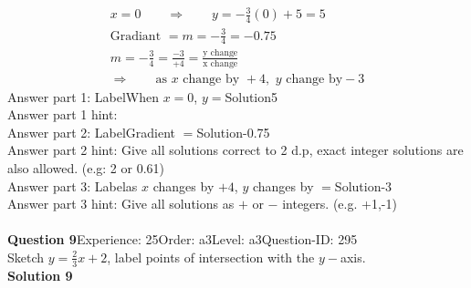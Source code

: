 \documentclass{article}
\begin{document}
\\[-35pt]\begin{align*}
&x=0\qquad\Rightarrow\qquad y=-\displaystyle\frac{3}{4}(0)+5=5&\\[2pt]
&\text{Gradiant}\,\,=m=-\displaystyle\frac{3}{4}=-0.75&\\[2pt]
&m=-\displaystyle\frac{3}{4}=\displaystyle\frac{-3}{+4}=\displaystyle\frac{\text{y change}}{\text{x change}}&\\[2pt]
& \Rightarrow\qquad \text{as}\,\, x \,\,\text{change by } +4,\,\, y\,\, \text{change by} -3 &
\end{align*}
Answer part 1: \hspace{10pt}Label\hspace{10pt}When $x=0$, $y=$\hspace{10pt}Solution\hspace{10pt}5\\
Answer part 1 hint: \hspace{15pt}\\
Answer part 2: \hspace{10pt}Label\hspace{10pt}Gradient $=$\hspace{10pt}Solution\hspace{10pt}-0.75\\
Answer part 2 hint: \hspace{15pt}Give all solutions correct to 2 d.p, exact integer solutions are also allowed. (e.g: 2 or 0.61)\\
Answer part 3: \hspace{10pt}Label\hspace{10pt}as $x$ changes by $+4$, $y$ changes by $=$\hspace{10pt}Solution\hspace{10pt}-3\\
Answer part 3 hint: \hspace{15pt}Give all solutions as $+$ or $-$ integers. (e.g. +1,-1)\\
\\[4pt]
\noindent\textbf{Question 9}\hspace{20pt}Experience: 25\hspace{20pt}Order: a3\hspace{20pt}Level: a3\hspace{20pt}Question-ID: 295\\[2pt]
Sketch $y=\displaystyle\frac{2}{3}x+2$, label points of intersection with the $y-$axis.\\[4pt]
\noindent\textbf{Solution 9}\\[2pt]
\end{document}
